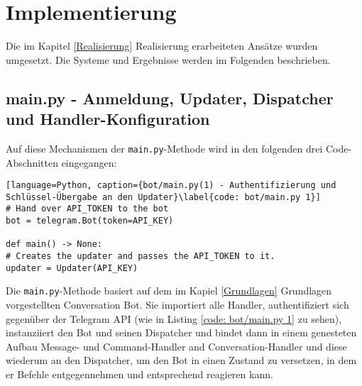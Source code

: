 \label{Implementierung}
\chapter{Implementierung}

    Die im Kapitel \ref*{Realisierung} Realisierung erarbeiteten Ansätze wurden umgesetzt. Die Systeme und Ergebnisse werden im Folgenden beschrieben.

    \section{main.py - Anmeldung, Updater, Dispatcher und Handler-Konfiguration} \label{main.py}
        Auf diese Mechanismen der \verb|main.py|-Methode wird in den folgenden drei Code-Abschnitten eingegangen:
        \begin{lstlisting}[language=Python, caption={bot/main.py(1) - Authentifizierung und Schlüssel-Übergabe an den Updater}\label{code: bot/main.py 1}]
# Hand over API_TOKEN to the bot
bot = telegram.Bot(token=API_KEY)

def main() -> None:
# Creates the updater and passes the API_TOKEN to it.
updater = Updater(API_KEY)
        \end{lstlisting}
        Die \verb|main.py|-Methode basiert auf dem im Kapiel \ref*{Grundlagen} Grundlagen vorgestellten Conversation Bot. Sie importiert alle Handler, authentifiziert sich gegenüber der Telegram API (wie in Listing \ref*{code: bot/main.py 1} zu sehen), instanziiert den Bot und seinen Dispatcher und bindet dann in einem genesteten Aufbau Message- und Command-Handler and Conversation-Handler und diese wiederum an den Dispatcher, um den Bot in einen Zustand zu versetzen, in dem er Befehle entgegennehmen und entsprechend reagieren kann. \\
        
